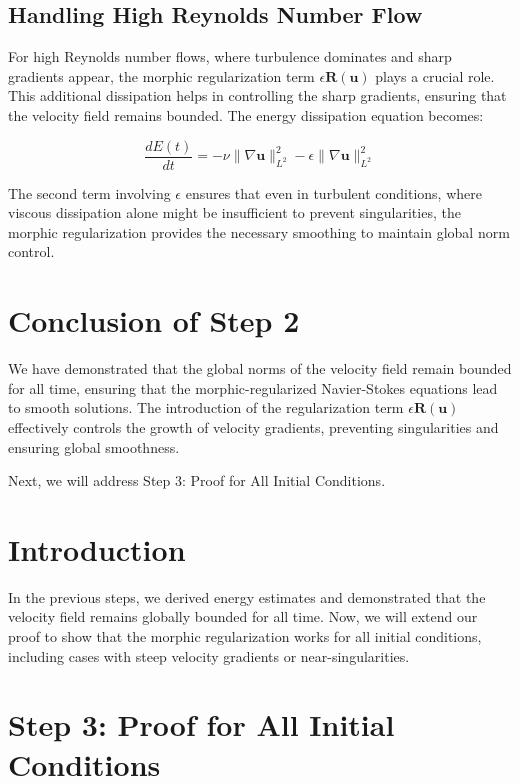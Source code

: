 \documentclass{article}
\begin{document}
\subsection*{Handling High Reynolds Number Flow}

For high Reynolds number flows, where turbulence dominates and sharp gradients appear, the morphic regularization term \( \epsilon \mathbf{R}(\mathbf{u}) \) plays a crucial role. This additional dissipation helps in controlling the sharp gradients, ensuring that the velocity field remains bounded. The energy dissipation equation becomes:

\[
\frac{dE(t)}{dt} = -\nu \|\nabla \mathbf{u}\|_{L^2}^2 - \epsilon \|\nabla \mathbf{u}\|_{L^2}^2
\]

The second term involving \( \epsilon \) ensures that even in turbulent conditions, where viscous dissipation alone might be insufficient to prevent singularities, the morphic regularization provides the necessary smoothing to maintain global norm control.

\section*{Conclusion of Step 2}

We have demonstrated that the global norms of the velocity field remain bounded for all time, ensuring that the morphic-regularized Navier-Stokes equations lead to smooth solutions. The introduction of the regularization term \( \epsilon \mathbf{R}(\mathbf{u}) \) effectively controls the growth of velocity gradients, preventing singularities and ensuring global smoothness.

Next, we will address Step 3: Proof for All Initial Conditions.
\section*{Introduction}

In the previous steps, we derived energy estimates and demonstrated that the velocity field remains globally bounded for all time. Now, we will extend our proof to show that the morphic regularization works for all initial conditions, including cases with steep velocity gradients or near-singularities.

\section{Step 3: Proof for All Initial Conditions}
\end{document}

